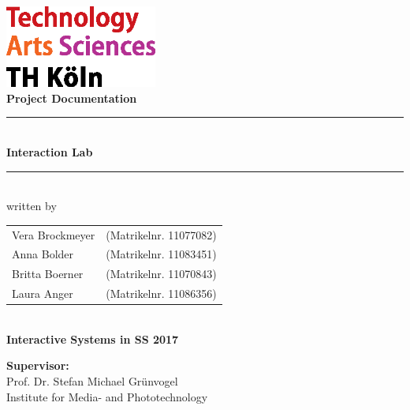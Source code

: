 \thispagestyle{empty}
\begin{center}
	\includegraphics[width=5cm]{Images/logo_TH}\\[12ex]
	{\Huge\textbf{Project Documentation}}\\[8ex]
	\rule{.8\textwidth}{.2pt}
	{\Large\\[1ex] \textbf{Interaction Lab}}\\
	\rule{.8\textwidth}{.2pt}\\[10ex]
	written by\\[2ex]
	\begin{tabular}{ll}
		Vera Brockmeyer &(Matrikelnr. 11077082)\\
		Anna Bolder &(Matrikelnr. 11083451)\\
		Britta Boerner &(Matrikelnr. 11070843)\\
		Laura Anger &(Matrikelnr. 11086356)\\ 
	\end{tabular}\\[10ex]
	\textbf{Interactive Systems in SS 2017}\\			
\end{center}
\vfill
\begin{flushleft}
	{\bf Supervisor:}\\
	Prof. Dr. Stefan Michael Grünvogel\\
	Institute for Media- and Phototechnology
\end{flushleft}
\newpage